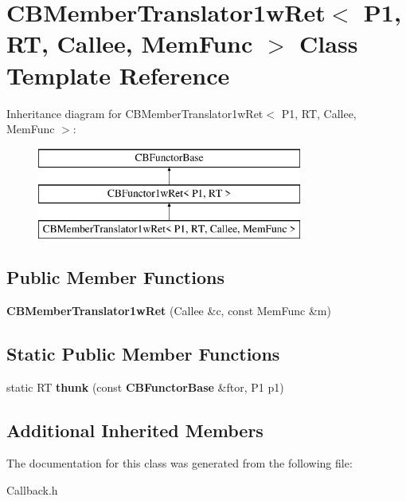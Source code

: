 \section{C\+B\+Member\+Translator1w\+Ret$<$ P1, RT, Callee, Mem\+Func $>$ Class Template Reference}
\label{classCBMemberTranslator1wRet}
Inheritance diagram for C\+B\+Member\+Translator1w\+Ret$<$ P1, RT, Callee, Mem\+Func $>$\+:\begin{figure}[H]
\begin{center}
\leavevmode
\includegraphics[height=3.000000cm]{classCBMemberTranslator1wRet}
\end{center}
\end{figure}
\subsection*{Public Member Functions}
\begin{DoxyCompactItemize}
\item 
{\bfseries C\+B\+Member\+Translator1w\+Ret} (Callee \&c, const Mem\+Func \&m)\label{classCBMemberTranslator1wRet_a38d17dfd10f274c581873edf4886c606}

\end{DoxyCompactItemize}
\subsection*{Static Public Member Functions}
\begin{DoxyCompactItemize}
\item 
static RT {\bfseries thunk} (const {\bf C\+B\+Functor\+Base} \&ftor, P1 p1)\label{classCBMemberTranslator1wRet_ae2177eab2be5fd4837cb63cc35252a00}

\end{DoxyCompactItemize}
\subsection*{Additional Inherited Members}


The documentation for this class was generated from the following file\+:\begin{DoxyCompactItemize}
\item 
Callback.\+h\end{DoxyCompactItemize}
